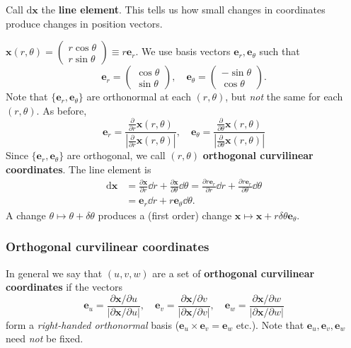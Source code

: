 \begin{definition}
    Call $ \mathrm{d} \mathbf{x} $ the \textbf{line element}. This tells us how small changes in coordinates produce changes in position vectors.
\end{definition}

\begin{example}
    $ \mathbf{x}(r,\theta)=\begin{pmatrix}
        r\cos \theta \\ r\sin\theta
    \end{pmatrix}\equiv r\mathbf{e}_r $. We use basis vectors $ \mathbf{e}_r,\mathbf{e}_\theta $ such that 
    \[
        \mathbf{e}_r=\begin{pmatrix}
            \cos\theta \\ \sin\theta
        \end{pmatrix},\quad \mathbf{e}_\theta = \begin{pmatrix}
            -\sin \theta  \\\cos \theta 
        \end{pmatrix}.
    \]
    Note that $ \{\mathbf{e}_r,\mathbf{e}_\theta\} $ are orthonormal at each $ (r,\theta) $, but \textit{not} the same for each $ (r,\theta) $. As before,
    \[
        \mathbf{e}_r = \frac{\frac{\partial }{\partial r}\mathbf{x}(r,\theta) }{\left| \frac{\partial }{\partial r}\mathbf{x}(r,\theta) \right| },\quad \mathbf{e}_\theta=\frac{\frac{\partial }{\partial \theta}\mathbf{x}(r,\theta) }{\left| \frac{\partial }{\partial \theta}\mathbf{x}(r,\theta) \right| }
    \]
    Since $ \{\mathbf{e}_r,\mathbf{e}_\theta\} $ are orthogonal, we call $ (r,\theta) $ \textbf{orthogonal curvilinear coordinates}. The line element is 
    \begin{align*}
        \mathrm{d} \mathbf{x}&= \frac{\partial \mathbf{x}}{\partial r}\dd r+\frac{\partial \mathbf{x}}{\partial \theta}\dd \theta = \frac{\partial r\mathbf{e}_r}{\partial r}\dd r+\frac{\partial r\mathbf{e}_r}{\partial \theta}\dd \theta\\ 
        &= \mathbf{e}_r \dd r+ r\mathbf{e}_\theta\dd \theta.
    \end{align*}
    A change $ \theta \mapsto \theta+ \delta \theta $ produces a (first order) change $ \mathbf{x}\mapsto \mathbf{x}+r\delta \theta\mathbf{e}_\theta  $.
\end{example}

\subsubsection*{Orthogonal curvilinear coordinates}
In general we say that $(u, v, w)$ are a set of \textbf{orthogonal curvilinear coordinates} if the vectors
\[
    \mathbf{e}_u = \frac{\partial \mathbf{x}/\partial u }{\left| \partial \mathbf{x}/\partial u \right| },\quad \mathbf{e}_v=\frac{\partial \mathbf{x}/\partial v }{\left| \partial \mathbf{x}/\partial v \right| },\quad \mathbf{e}_w=\frac{\partial \mathbf{x}/\partial w }{\left| \partial \mathbf{x}/\partial w \right| }
\]
form a \textit{right-handed orthonormal} basis ($ \mathbf{e}_u\times\mathbf{e}_v=\mathbf{e}_w $ etc.). Note that $ \mathbf{e}_u,\mathbf{e}_v,\mathbf{e}_w $ need \textit{not} be fixed.

